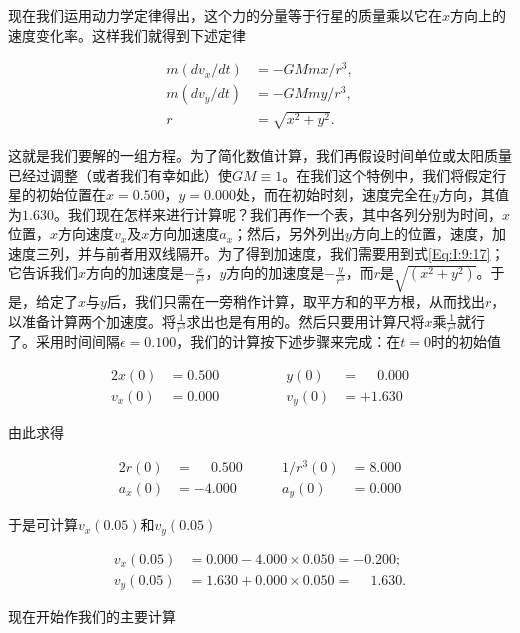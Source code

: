\documentclass[12pt,oneside]{book}
\begin{document}
现在我们运用动力学定律得出，这个力的分量等于行星的质量乘以它在$x$方向上的速度变化率。这样我们就得到下述定律

\begin{equation}
\begin{aligned}
m(dv_x/dt)&=-GMmx/r^3,\\
m(dv_y/dt)&=-GMmy/r^3,\\
r&=\sqrt{x^2+y^2}.
\end{aligned}
\label{Eq:I:9:17}
\end{equation}

这就是我们要解的一组方程。为了简化数值计算，我们再假设时间单位或太阳质量已经过调整（或者我们有幸如此）使$GM\equiv1$。在我们这个特例中，我们将假定行星的初始位置在$x = 0.500$，$y = 0.000$处，而在初始时刻，速度完全在$y$方向，其值为$1.630$。我们现在怎样来进行计算呢？我们再作一个表，其中各列分别为时间，$x$位置，$x$方向速度$v_{x}$及$x$方向加速度$a_{x}$；然后，另外列出$y$方向上的位置，速度，加速度三列，并与前者用双线隔开。为了得到加速度，我们需要用到式\eqref{Eq:I:9:17}；它告诉我们$x$方向的加速度是$-\frac{x}{r^{3}}$，$y$方向的加速度是$-\frac{y}{r^{3}}$，而$r$是$\sqrt{(x^{2}+y^{2})}$。于是，给定了$x$与$y$后，我们只需在一旁稍作计算，取平方和的平方根，从而找出$r$，以准备计算两个加速度。将$\frac{1}{r^{3}}$求出也是有用的。然后只要用计算尺将$x$乘$\frac{1}{r^{3}}$就行了。采用时间间隔$\epsilon = 0.100$，我们的计算按下述步骤来完成：在$t = 0$时的初始值

\begin{alignat*}{2}
x(0)&=0.500&\qquad\qquad y(0)&=\phantom{+}0.000\\[.5ex]
v_x(0)&=0.000&\qquad\qquad v_y(0)&=+1.630
\end{alignat*}

由此求得

\begin{alignat*}{2}
r(0)&=\phantom{-}0.500&\qquad 1/r^3(0)&=8.000\\[.5ex]
a_x(0)&=-4.000&\qquad a_y(0)&=0.000
\end{alignat*}

于是可计算$v_{x}(0.05)$和$v_{y}(0.05)$

\begin{align*}
v_x(0.05) &= 0.000 - 4.000 \times 0.050 = -0.200;\\[1ex]
v_y(0.05) &= 1.630 + 0.000 \times 0.050 = \phantom{-}1.630.
\end{align*}

现在开始作我们的主要计算
\end{document}
